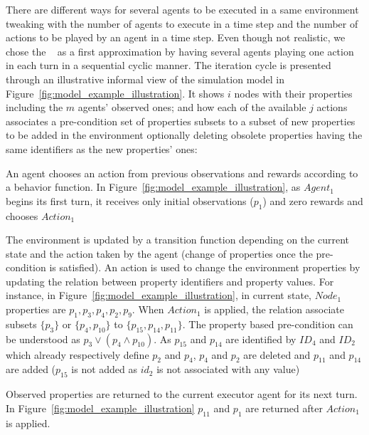 \documentclass[conference]{IEEEtran}
\begin{document}
There are different ways for several agents to be executed in a same environment tweaking with the number of agents to execute in a time step and the number of actions to be played by an agent in a time step. Even though not realistic, we chose the ~\cite{jk2020} as a first approximation by having several agents playing one action in each turn in a sequential cyclic manner. The iteration cycle is presented through an illustrative informal view of the simulation model in Figure~\ref{fig:model_example_illustration}. It shows $i$ nodes with their properties including the $m$ agents' observed ones; and how each of the available $j$ actions associates a pre-condition set of properties subsets to a subset of new properties to be added in the environment optionally deleting obsolete properties having the same identifiers as the new properties' ones: \begin{enumerate*}[label=\arabic*),itemjoin={;\quad}]
    \item An agent chooses an action from previous observations and rewards according to a behavior function. In Figure~\ref{fig:model_example_illustration}, as $Agent_1$ begins its first turn, it receives only initial observations ($p_{1}$) and zero rewards and chooses $Action_1$

    \item The environment is updated by a transition function depending on the current state and the action taken by the agent (change of properties once the pre-condition is satisfied). An action is used to change the environment properties by updating the relation between property identifiers and property values.
    For instance, in Figure~\ref{fig:model_example_illustration}, in current state, $Node_1$ properties are $p_1,p_3,p_4,p_2,p_9$. When $Action_1$ is applied, the relation associate subsets $\{p_3\}$ or $\{p_4, \allowbreak p_{10}\}$ to $\{p_{15}, \allowbreak p_{14}, \allowbreak p_{11}\}$. The property based pre-condition can be understood as $p_3 \lor (p_4 \land p_{10})$. As $p_{15}$ and $p_{14}$ are identified by $ID_4$ and $ID_2$ which already respectively define $p_{2}$ and $p_{4}$, $p_{4}$ and $p_{2}$ are deleted and $p_{11}$ and $p_{14}$ are added ($p_{15}$ is not added as $id_2$ is not associated with any value)

    \item Observed properties are returned to the current executor agent for its next turn. In Figure~\ref{fig:model_example_illustration} $p_{11}$ and $p_1$ are returned after $Action_1$ is applied.

\end{enumerate*}
\end{document}
